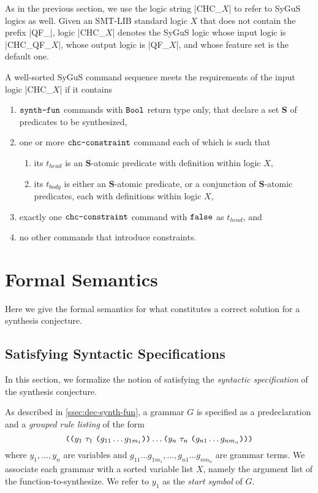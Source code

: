 \documentclass[english,a4paper,10pt]{article}
\begin{document}
As in the previous section, 
we use the logic string \code|CHC_$X$| to refer to SyGuS logics as well.
Given an SMT-LIB standard logic $X$
that does not contain the prefix \code|QF_|,
logic \code|CHC_$X$| denotes the SyGuS logic
whose input logic is \code|CHC_QF_$X$|,
whose output logic is \code|QF_$X$|,
and whose feature set is the default one.

A well-sorted SyGuS command sequence meets the requirements of the input logic \code|CHC_$X$|
if it contains
\begin{enumerate}
  \item $\texttt{synth-fun}$ commands with $\texttt{Bool}$ return type only, that declare a set $\mathbf{S}$ of predicates to be synthesized,
  \item one or more $\texttt{chc-constraint}$ command each of which is such that
        \begin{enumerate}
          \item its $t_{head}$ is an $\mathbf{S}$-atomic predicate with definition within logic $X$,
          \item its $t_{body}$ is either an $\mathbf{S}$-atomic predicate, or a conjunction of $\mathbf{S}$-atomic predicates,
                each with definitions within logic $X$,
        \end{enumerate}
  \item exactly one $\texttt{chc-constraint}$ command with $\texttt{false}$ as $t_{head}$, and
  \item no other commands that introduce constraints.
\end{enumerate}

\section{Formal Semantics}%
\label{sec:logical-semantics}

Here we give the formal semantics
for what constitutes a correct solution for a synthesis conjecture.

\subsection{Satisfying Syntactic Specifications}
\label{ssec:sat-syntactic}

In this section,
we formalize the notion of satisfying the \emph{syntactic specification}
of the synthesis conjecture.

As described in \cref{ssec:dec-synth-fun},
a grammar $G$ is specified as a predeclaration and
a \emph{grouped rule listing} of the form
\[
\texttt{(}\texttt{(}y_1\mbox{ }\tau_1\mbox{ }\texttt{(}g_{11} \ldots g_{1m_1} \texttt{)} \texttt{)} \ldots 
\texttt{(}y_n\mbox{ }\tau_n\mbox{ }\texttt{(}g_{n1} \ldots g_{nm_n} \texttt{)} \texttt{)}\texttt{)}
\]
where $y_1, \ldots, y_n$ are variables
and $g_{11} \ldots g_{1m_1}, \ldots, g_{n1} \ldots g_{nm_n}$
are grammar terms.
We associate each grammar with a sorted variable list $X$,
namely the argument list of the function-to-synthesize.
We refer to $y_1$ as the \emph{start symbol} of $G$.
\end{document}
